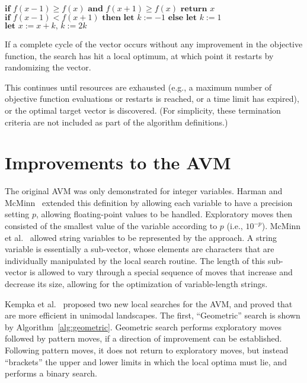 \documentclass{llncs}
\newcommand{\inlineheading}[1]{\vspace{1ex} \noindent {\bf #1.}}
\begin{document}
\begin{algorithm}[b]
	\footnotesize
	\caption{$\text{Iterated Pattern Search, starting at }x\in D$}
	\begin{algorithmic}[1]
			\STATE$\textbf{if }f(x-1)\geq f(x)\textbf{ and }f(x+1)\geq f(x)\textbf{ return }x$
			\STATE$\textbf{if }f(x-1)<f(x+1)\textbf{ then let }k:=-1\textbf{ else let }k:=1$
				\STATE$\textbf{let }x:=x+k\text{, }k:=2k$
			\ENDWHILE
		\ENDWHILE
	\end{algorithmic}
	\label{alg:ips}
\end{algorithm}

If a complete cycle of the vector occurs without any improvement in the objective function, the search has hit a local optimum, at which point it restarts by randomizing the vector.

This continues until resources are exhausted (e.g., a maximum number of objective function evaluations or restarts is reached, or a time limit has expired), or the optimal target vector is discovered. (For simplicity, these termination criteria are not included as part of the algorithm definitions.)



\section{Improvements to the AVM}
\label{sec:improvements}

\inlineheading{Representations}
The original AVM was only demonstrated for integer variables. Harman and McMinn~\cite{Harman2007} extended this definition by allowing each variable to have a precision setting $p$, allowing floating-point values to be handled. Exploratory moves then consisted of the smallest value of the variable according to $p$ (i.e., $10^{-p}$). McMinn et al.~\cite{McMinn2015} allowed string variables to be represented by the approach. A string variable is essentially a sub-vector, whose elements are characters that are individually manipulated by the local search routine. The length of this sub-vector is allowed to vary through a special sequence of moves that increase and decrease its size, allowing for the optimization of variable-length strings.

\inlineheading{Algorithms}
Kempka et al.~\cite{Kempka2015} proposed two new local searches for the AVM, and proved that are more efficient in unimodal landscapes. The first, ``Geometric'' search is shown by Algorithm~\ref{alg:geometric}. Geometric search performs exploratory moves followed by pattern moves, if a direction of improvement can be established. Following pattern moves, it does not return to exploratory moves, but instead ``brackets'' the upper and lower limits in which the local optima must lie, and performs a binary search.
\end{document}
